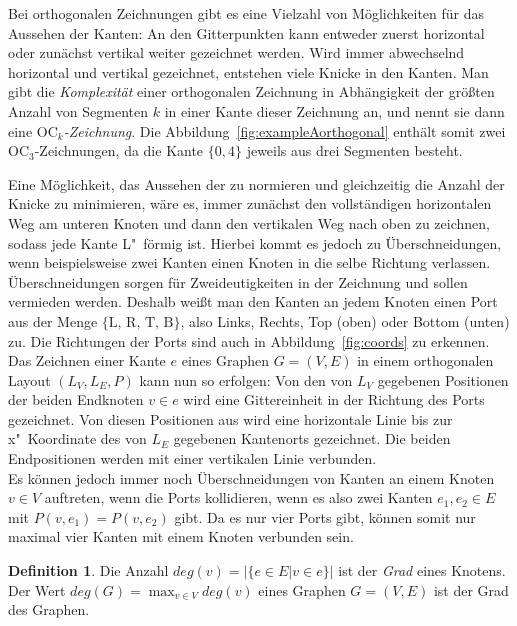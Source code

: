 \documentclass[a4paper]{scrreprt}
\theoremstyle{definition}
\newtheorem{definition}[satz]{Definition}
\begin{document}
Bei orthogonalen Zeichnungen gibt es eine Vielzahl von Möglichkeiten für das Aussehen der Kanten: An den Gitterpunkten kann entweder zuerst horizontal oder zunächst vertikal weiter gezeichnet werden. Wird immer abwechselnd horizontal und vertikal gezeichnet, entstehen viele Knicke in den Kanten. Man gibt die \emph{Komplexität} einer orthogonalen Zeichnung in Abhängigkeit der größten Anzahl von Segmenten $k$ in einer Kante dieser Zeichnung an, und nennt sie dann eine \emph{$\text{OC}_k$-Zeichnung}. Die Abbildung~\ref{fig:exampleAorthogonal} enthält somit zwei OC$_3$-Zeichnungen, da die Kante $\{0,4\}$ jeweils aus drei Segmenten besteht.

Eine Möglichkeit, das Aussehen der zu normieren und gleichzeitig die Anzahl der Knicke zu minimieren, wäre es, immer zunächst den vollständigen horizontalen Weg am unteren Knoten und dann den vertikalen Weg nach oben zu zeichnen, sodass jede Kante L"~förmig ist. Hierbei kommt es jedoch zu Überschneidungen, wenn beispielsweise zwei Kanten einen Knoten in die selbe Richtung verlassen. Überschneidungen sorgen für Zweideutigkeiten in der Zeichnung und sollen vermieden werden. Deshalb weißt man den Kanten an jedem Knoten einen Port aus der Menge $\{\text{L, R, T, B}\}$, also Links, Rechts, Top (oben) oder Bottom (unten) zu. Die Richtungen der Ports sind auch in Abbildung~\ref{fig:coords} zu erkennen.
\\

Das Zeichnen einer Kante $e$ eines Graphen $G = (V,E)$ in einem orthogonalen Layout $(L_V,L_E,P)$ kann nun so erfolgen: Von den von $L_V$ gegebenen Positionen der beiden Endknoten $v \in e$ wird eine Gittereinheit in der Richtung des Ports gezeichnet. Von diesen Positionen aus wird eine horizontale Linie bis zur x"~Koordinate des von $L_E$ gegebenen Kantenorts gezeichnet. Die beiden Endpositionen werden mit einer vertikalen Linie verbunden. %
\\

Es können jedoch immer noch Überschneidungen von Kanten an einem Knoten $v \in V$ auftreten, wenn die Ports kollidieren, wenn es also zwei Kanten $e_1, e_2 \in E$ mit $P(v, e_1) = P(v, e_2)$ gibt. Da es nur vier Ports gibt, können somit nur maximal vier Kanten mit einem Knoten verbunden sein.

\begin{definition}
  Die Anzahl $deg(v) = |\{e \in E | v \in e\}|$ ist der \emph{Grad} eines Knotens. Der Wert $deg(G) = \max_{v \in V}{deg(v)}$ eines Graphen $G = (V, E)$ ist der Grad des Graphen.
\end{definition}
\end{document}
